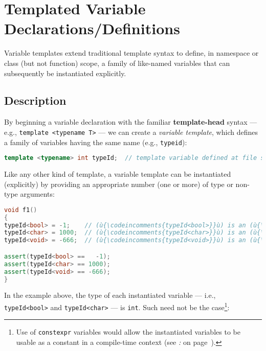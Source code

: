 \newpage
\section[Variable Templates]{Templated Variable Declarations/Definitions}
\label{variable-templates}


Variable templates extend traditional template syntax to define, in namespace or
class (but not function) scope, a family of like-named variables that
can subsequently be instantiated explicitly.

\subsection[Description]{Description}\label{variabletemplate-description}

By beginning a variable declaration with the familiar
\textbf{template-head} syntax --- e.g.,
\texttt{template}~\texttt{<typename}~\texttt{T>} --- we can create a
\emph{variable template}, which defines a family of variables having the
same name (e.g., \texttt{typeid}):

\begin{lstlisting}[language=C++]
template <typename> int typeId;  // template variable defined at file scope
\end{lstlisting}

\noindent Like any other kind of template, a variable template can be instantiated
(explicitly) by providing an appropriate number (one or more) of type or
non-type arguments:

\begin{lstlisting}[language=C++]
void f1()
{
typeId<bool> = -1;    // (ù{\codeincomments{typeId<bool>}}ù) is an (ù{\codeincomments{int}}ù)
typeId<char> = 1000;  // (ù{\codeincomments{typeId<char>}}ù) is an (ù{\codeincomments{int}}ù)
typeId<void> = -666;  // (ù{\codeincomments{typeId<void>}}ù) is an (ù{\codeincomments{int}}ù)

assert(typeId<bool> ==   -1);
assert(typeId<char> == 1000);
assert(typeId<void> == -666);
}
\end{lstlisting}

\noindent In the example above, the type of each instantiated variable --- i.e.,
\texttt{typeId<bool>} and \texttt{typeId<char>} --- is \texttt{int}.
Such need not be the case{\cprotect\footnote{Use of
\texttt{constexpr} variables would allow the instantiated
variables to be usable as a constant in a compile-time context (see
{\it{}:} {\it{}} on page~\pageref{parametrized-constants}).}}:


